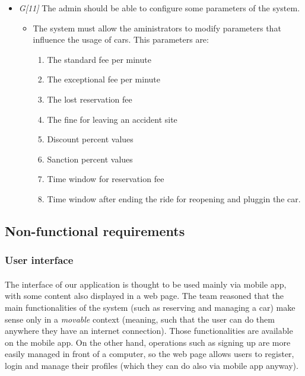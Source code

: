 \begin{itemize}
				\item \textit{G[11]} The admin should be able to configure some parameters of the system.
					\begin{itemize}
						\item The system must allow the aministrators to modify parameters that influence the usage of cars. This parameters are:
							\begin{enumerate}
								\item The standard fee per minute
								\item The exceptional fee per minute
								\item The lost reservation fee
								\item The fine for leaving an accident site %
								\item Discount percent values
								\item Sanction percent values
								\item Time window for reservation fee
								\item Time window after ending the ride for reopening and pluggin the car.
							\end{enumerate}
					\end{itemize}
\end{itemize}





\subsection{Non-functional requirements}
	\subsubsection{User interface}
	\paragraph{}The interface of our application is thought to be used mainly via mobile app, with some content also displayed in a web page. The team reasoned that the main functionalities of the system (such as reserving and managing a car) make sense only in a \textit{movable} context (meaning, such that the user can do them anywhere they have an internet connection). Those functionalities are available on the mobile app. On the other hand, operations such as signing up are more easily managed in front of a computer, so the web page allows users to register, login and manage their profiles (which they can do also via mobile app anyway).
